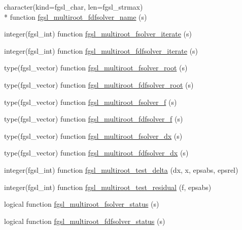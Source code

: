 \begin{DoxyCompactItemize}
\item 
character(kind=fgsl\-\_\-char, len=fgsl\-\_\-strmax) \\*
function \hyperlink{multiroots_8finc_abc59e0be63f6c4126420aeab1c20081c}{fgsl\-\_\-multiroot\-\_\-fdfsolver\-\_\-name} (s)
\item 
integer(fgsl\-\_\-int) function \hyperlink{multiroots_8finc_ad1d089816977209d88134f95979c2726}{fgsl\-\_\-multiroot\-\_\-fsolver\-\_\-iterate} (s)
\item 
integer(fgsl\-\_\-int) function \hyperlink{multiroots_8finc_a7c2d7b128df269454d93454e6d4117f2}{fgsl\-\_\-multiroot\-\_\-fdfsolver\-\_\-iterate} (s)
\item 
type(fgsl\-\_\-vector) function \hyperlink{multiroots_8finc_a756becbde20557aeffb366a0bbcf8177}{fgsl\-\_\-multiroot\-\_\-fsolver\-\_\-root} (s)
\item 
type(fgsl\-\_\-vector) function \hyperlink{multiroots_8finc_a5b98f55eae83d12a4c0d70b7b6c26508}{fgsl\-\_\-multiroot\-\_\-fdfsolver\-\_\-root} (s)
\item 
type(fgsl\-\_\-vector) function \hyperlink{multiroots_8finc_a7a1a3c9bbcec3621cad66f2a87608bd5}{fgsl\-\_\-multiroot\-\_\-fsolver\-\_\-f} (s)
\item 
type(fgsl\-\_\-vector) function \hyperlink{multiroots_8finc_a3d551eb292c92b30f9628ea8e1d6d251}{fgsl\-\_\-multiroot\-\_\-fdfsolver\-\_\-f} (s)
\item 
type(fgsl\-\_\-vector) function \hyperlink{multiroots_8finc_af5cd6b1ed7e6cb7589c2e64cd4ff22e9}{fgsl\-\_\-multiroot\-\_\-fsolver\-\_\-dx} (s)
\item 
type(fgsl\-\_\-vector) function \hyperlink{multiroots_8finc_a6fa2ba8b4311978a0a28d45afacffeaf}{fgsl\-\_\-multiroot\-\_\-fdfsolver\-\_\-dx} (s)
\item 
integer(fgsl\-\_\-int) function \hyperlink{multiroots_8finc_ad67125d3ae3d333fa1211fdb9ee6c58a}{fgsl\-\_\-multiroot\-\_\-test\-\_\-delta} (dx, x, epsabs, epsrel)
\item 
integer(fgsl\-\_\-int) function \hyperlink{multiroots_8finc_a112c4005ac06aedd7bf4233dbad69244}{fgsl\-\_\-multiroot\-\_\-test\-\_\-residual} (f, epsabs)
\item 
logical function \hyperlink{multiroots_8finc_a1c59daa00ab109e098aab62bc3377912}{fgsl\-\_\-multiroot\-\_\-fsolver\-\_\-status} (s)
\item 
logical function \hyperlink{multiroots_8finc_aa39ce86a033dc3df2cdabd8c2c98215f}{fgsl\-\_\-multiroot\-\_\-fdfsolver\-\_\-status} (s)
\end{DoxyCompactItemize}


